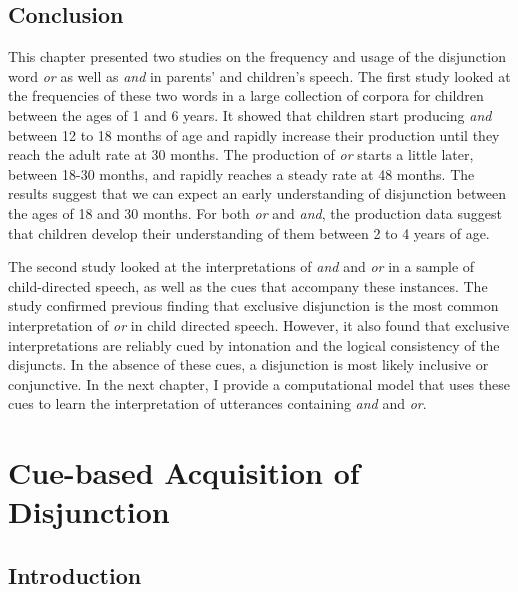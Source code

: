 \documentclass[oneside]{report}
\theoremstyle{definition}
\theoremstyle{definition}
\theoremstyle{definition}
\theoremstyle{remark}
\begin{document}
\section{Conclusion}\label{conclusion}

This chapter presented two studies on the frequency and usage of the
disjunction word \emph{or} as well as \emph{and} in parents' and
children's speech. The first study looked at the frequencies of these
two words in a large collection of corpora for children between the ages
of 1 and 6 years. It showed that children start producing \emph{and}
between 12 to 18 months of age and rapidly increase their production
until they reach the adult rate at 30 months. The production of
\emph{or} starts a little later, between 18-30 months, and rapidly
reaches a steady rate at 48 months. The results suggest that we can
expect an early understanding of disjunction between the ages of 18 and
30 months. For both \emph{or} and \emph{and}, the production data
suggest that children develop their understanding of them between 2 to 4
years of age.

The second study looked at the interpretations of \emph{and} and
\emph{or} in a sample of child-directed speech, as well as the cues that
accompany these instances. The study confirmed previous finding that
exclusive disjunction is the most common interpretation of \emph{or} in
child directed speech. However, it also found that exclusive
interpretations are reliably cued by intonation and the logical
consistency of the disjuncts. In the absence of these cues, a
disjunction is most likely inclusive or conjunctive. In the next
chapter, I provide a computational model that uses these cues to learn
the interpretation of utterances containing \emph{and} and \emph{or}.

\chapter{Cue-based Acquisition of Disjunction}\label{modeling}

\section{Introduction}\label{introduction-3}
\end{document}
